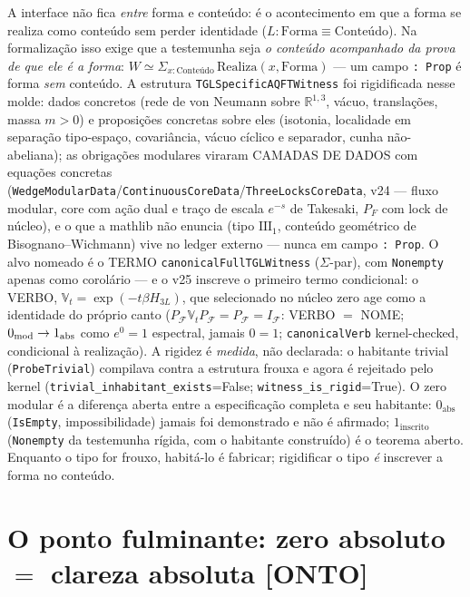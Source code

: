 \documentclass[11pt]{article}
\providecommand{\kernelmk}[1]{\textsf{[KERNEL]}~\texttt{#1}}\providecommand{\knownmk}[1]{\textsf{[KNOWN]}~{#1}}\providecommand{\statusmk}[1]{\textsf{[#1]}}
\theoremstyle{definition}\newtheorem{deriv}{Derivação}
\begin{document}
A interface não fica \emph{entre} forma e conteúdo: é o acontecimento em que a forma se realiza como conteúdo sem perder identidade ($L:\mathrm{Forma}\equiv\mathrm{Conteúdo}$). Na formalização isso exige que a testemunha seja \emph{o conteúdo acompanhado da prova de que ele é a forma}: $W\simeq\Sigma_{x:\mathrm{Conteúdo}}\,\mathrm{Realiza}(x,\mathrm{Forma})$ --- um campo \texttt{: Prop} é forma \emph{sem} conteúdo. A estrutura \texttt{TGLSpecificAQFTWitness} foi rigidificada nesse molde: dados concretos (rede de von Neumann sobre $\mathbb R^{1,3}$, vácuo, translações, massa $m>0$) e proposições concretas sobre eles (isotonia, localidade em separação tipo-espaço, covariância, vácuo cíclico e separador, cunha não-abeliana); as obrigações modulares viraram CAMADAS DE DADOS com equações concretas (\texttt{WedgeModularData}/\texttt{ContinuousCoreData}/\texttt{ThreeLocksCoreData}, v24 --- fluxo modular, core com ação dual e traço de escala $e^{-s}$ de Takesaki, $P_F$ com lock de núcleo), e o que a mathlib não enuncia (tipo $\mathrm{III}_1$, conteúdo geométrico de Bisognano--Wichmann) vive no ledger externo --- nunca em campo \texttt{: Prop}. O alvo nomeado é o TERMO \texttt{canonicalFullTGLWitness} ($\Sigma$-par), com \texttt{Nonempty} apenas como corolário --- e o v25 inscreve o primeiro termo condicional: o VERBO, $\mathbb V_t=\exp(-t\beta H_{3L})$, que selecionado no núcleo zero age como a identidade do próprio canto ($P_{\mathcal F}\mathbb V_tP_{\mathcal F}=P_{\mathcal F}=I_{\mathcal F}$: VERBO $=$ NOME; $0_{\rm mod}\to1_{\rm abs}$ como $e^0=1$ espectral, jamais $0=1$; \texttt{canonicalVerb} kernel-checked, condicional à realização). A rigidez é \emph{medida}, não declarada: o habitante trivial (\texttt{ProbeTrivial}) compilava contra a estrutura frouxa e agora é rejeitado pelo kernel (\texttt{trivial\_inhabitant\_exists}=False; \texttt{witness\_is\_rigid}=True). O zero modular é a diferença aberta entre a especificação completa e seu habitante: $0_{\mathrm{abs}}$ (\texttt{IsEmpty}, impossibilidade) jamais foi demonstrado e não é afirmado; $1_{\mathrm{inscrito}}$ (\texttt{Nonempty} da testemunha rígida, com o habitante construído) é o teorema aberto. Enquanto o tipo for frouxo, habitá-lo é fabricar; rigidificar o tipo \emph{é} inscrever a forma no conteúdo.

\clearpage\providecommand{\kernelmk}[1]{\textsf{[KERNEL]}~\texttt{#1}}\providecommand{\knownmk}[1]{\textsf{[KNOWN]}~{#1}}\providecommand{\statusmk}[1]{\textsf{[#1]}}

\section*{O ponto fulminante: zero absoluto $=$ clareza absoluta \textsf{[ONTO]}}
\end{document}
